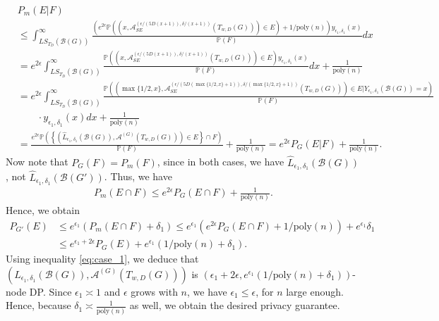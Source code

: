 \documentclass{article}
\begin{document}
\begin{align*}
&P_{m}(E|F)\\
&\leq \int_{LS_{{T_{D}}}(\mathcal{B}(G))}^{\infty}\frac{\left(e^{2\epsilon}\mathbb{P}\left((x, \mathcal{A}_{SE}^{(\epsilon/(5D(x + 1)), \delta/(x + 1))}(T_{w, D}(G))) \in E\right) + 1/\mathrm{poly}(n)\right)y_{\epsilon_1, \delta_1}(x)}{\mathbb{P}(F)}dx\\
&= e^{2\epsilon}\int_{LS_{{T_{D}}}(\mathcal{B}(G))}^{\infty}\frac{\mathbb{P}\left((x, \mathcal{A}_{SE}^{(\epsilon/(5D(x + 1)), \delta/(x + 1))}(T_{w, D}(G))) \in E\right)y_{\epsilon_1, \delta_1}(x)}{\mathbb{P}(F)}dx + \frac{1}{\mathrm{poly}(n)}\\
&= e^{2\epsilon}\int_{LS_{{T_{D}}}(\mathcal{B}(G))}^{\infty}\frac{\mathbb{P}\left((\max\{1/2, x\}, \mathcal{A}_{SE}^{(\epsilon/(5D(\max\{1/2, x\} + 1)), \delta/(\max\{1/2, x\} + 1))}(T_{w, D}(G))) \in E|Y_{\epsilon_1, \delta_1}(\mathcal{B}(G)) = x\right)}{\mathbb{P}(F)}\\
%
& \qquad \cdot y_{\epsilon_1, \delta_1}(x) dx + \frac{1}{\mathrm{poly}(n)}\\
&= \frac{e^{2\epsilon}\mathbb{P}\left(\left\{(\hat{L}_{\epsilon_1, \delta_1}(\mathcal{B}(G)), \mathcal{A}^{(G)}(T_{w, D}(G)))\in E\right\} \cap F\right)}{\mathbb{P}(F)} + \frac{1}{\mathrm{poly}(n)} = e^{2\epsilon}P_{G}(E|F) + \frac{1}{\mathrm{poly}(n)}.
\end{align*}
Now note that $P_{G}(F) = P_{m}(F)$, since in both cases, we have $\hat{L}_{\epsilon_1, \delta_1}(\mathcal{B}(G))$, not $\hat{L}_{\epsilon_1, \delta_1}(\mathcal{B}(G'))$. Thus, we have
\begin{align*}
P_{m}(E \cap F) \leq e^{2\epsilon}P_{G}(E \cap F) + \frac{1}{\mathrm{poly}(n)}.
\end{align*}
Hence, we obtain
\begin{align*}
P_{G'}(E) &\leq e^{\epsilon_1}(P_m(E \cap F) + \delta_1) \leq e^{\epsilon_1}(e^{2\epsilon}P_G(E \cap F) + 1/\mathrm{poly}(n)) + e^{\epsilon_1}\delta_1\\
&\leq e^{\epsilon_1 + 2\epsilon}P_G(E) + e^{\epsilon_1}(1/\mathrm{poly}(n) + \delta_1).
\end{align*}
Using inequality \eqref{eq:case_1}, we deduce that $(\hat{L}_{\epsilon_1, \delta_1}(\mathcal{B}(G)), \mathcal{A}^{(G)}(T_{w, D}(G)))$ is $(\epsilon_1 + 2\epsilon, e^{\epsilon_1}(1/\mathrm{poly}(n) + \delta_1))$-node DP. Since $\epsilon_1 \asymp 1$ and $\epsilon$ grows with $n$, we have $\epsilon_1 \leq \epsilon$, for $n$ large enough. Hence, because $\delta_1 \asymp \frac{1}{\mathrm{poly}(n)}$ as well, we obtain the desired privacy guarantee.
\end{document}
